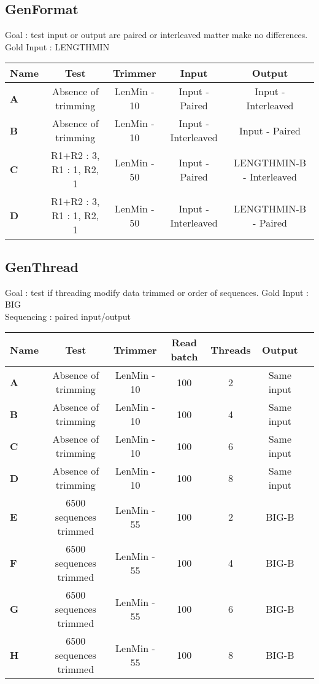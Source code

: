 \documentclass{article}
\begin{document}
\subsection{GenFormat}
Goal : test input or output are paired or interleaved matter make no differences.\\
Gold Input : LENGTHMIN
\begin{table}[H]
\begin{tabular}{|l|c|c|c|c|} \hline
    \textbf{Name} & \textbf{Test} & \textbf{Trimmer} & \textbf{Input} & \textbf{Output} \\ \hline
    \textbf{A} & Absence of trimming & LenMin - 10 & Input - Paired & Input - Interleaved \\ \hline
    \textbf{B} & Absence of trimming & LenMin - 10 & Input - Interleaved & Input - Paired \\ \hline
    \textbf{C} & R1+R2 : 3, R1 : 1, R2, 1 & LenMin - 50 & Input - Paired & LENGTHMIN-B - Interleaved\\ \hline
    \textbf{D} & R1+R2 : 3, R1 : 1, R2, 1 & LenMin - 50 & Input - Interleaved & LENGTHMIN-B - Paired\\ \hline
\end{tabular}
\end{table}

\subsection{GenThread}
Goal : test if threading modify data trimmed or order of sequences.
Gold Input : BIG\\
Sequencing : paired input/output
\begin{table}[H]
\begin{tabular}{|l|c|c|c|c|c|c|} \hline
    \textbf{Name} & \textbf{Test} & \textbf{Trimmer} & \textbf{Read batch} & \textbf{Threads} & \textbf{Output} \\ \hline
    \textbf{A} & Absence of trimming & LenMin - 10 & 100 & 2 & Same input \\ \hline
    \textbf{B} & Absence of trimming & LenMin - 10 & 100 & 4 & Same input\\ \hline
    \textbf{C} & Absence of trimming & LenMin - 10 & 100 & 6 & Same input\\ \hline
    \textbf{D} & Absence of trimming & LenMin - 10 & 100 & 8 & Same input\\ \hline

    \textbf{E} & 6500 sequences trimmed & LenMin - 55 & 100 & 2 & BIG-B\\ \hline
    \textbf{F} & 6500 sequences trimmed & LenMin - 55 & 100 & 4 & BIG-B\\ \hline
    \textbf{G} & 6500 sequences trimmed & LenMin - 55 & 100 & 6 & BIG-B\\ \hline
    \textbf{H} & 6500 sequences trimmed & LenMin - 55 & 100 & 8 & BIG-B \\ \hline
\end{tabular}
\end{table}
\end{document}
